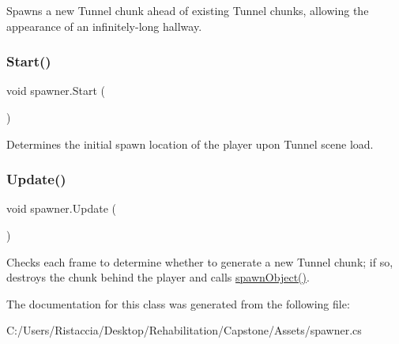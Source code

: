 Spawns a new Tunnel chunk ahead of existing Tunnel chunks, allowing the appearance of an infinitely-\/long hallway. \mbox{\label{classspawner_a4c368d2128f5f93a642d914c2b225faa}} 
\subsubsection{\texorpdfstring{Start()}{Start()}}
{\footnotesize\ttfamily void spawner.\+Start (\begin{DoxyParamCaption}{ }\end{DoxyParamCaption})\hspace{0.3cm}{\ttfamily [private]}}

Determines the initial spawn location of the player upon Tunnel scene load. \mbox{\label{classspawner_a845575b9eb2f04efe3b2eaa28a98f568}} 
\subsubsection{\texorpdfstring{Update()}{Update()}}
{\footnotesize\ttfamily void spawner.\+Update (\begin{DoxyParamCaption}{ }\end{DoxyParamCaption})\hspace{0.3cm}{\ttfamily [private]}}

Checks each frame to determine whether to generate a new Tunnel chunk; if so, destroys the chunk behind the player and calls \hyperlink{classspawner_a1a8587eb2ec4c5425d35d72afc7d4fac}{spawn\+Object()}. 

The documentation for this class was generated from the following file\+:\begin{DoxyCompactItemize}
\item 
C\+:/\+Users/\+Ristaccia/\+Desktop/\+Rehabilitation/\+Capstone/\+Assets/spawner.\+cs\end{DoxyCompactItemize}
